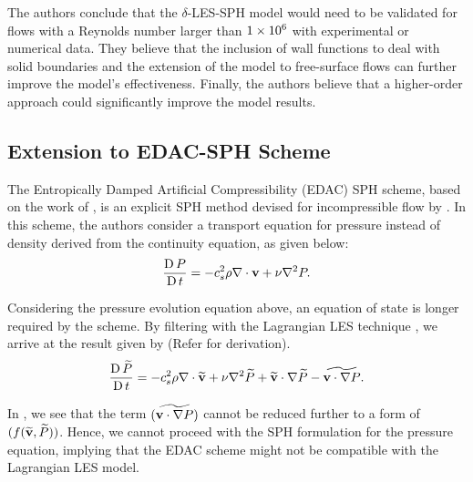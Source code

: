 The authors conclude that the $\delta$-LES-SPH model would need to be validated for flows with a Reynolds number larger than $1 \times {10}^{6}$ with experimental or numerical data. They believe that the inclusion of wall functions to deal with solid boundaries and the extension of the model to free-surface flows can further improve the model’s effectiveness. Finally, the authors believe that a higher-order approach could significantly improve the model results.

\subsection{Extension to EDAC-SPH Scheme}
\label{sec:Extension-to-EDAC-SPH-Scheme}
The Entropically Damped Artificial Compressibility (EDAC) SPH scheme, based on the work of \cite{Clausen2013}, is an explicit SPH method devised for incompressible flow by \cite{Ramachandran2019}.
In this scheme, the authors consider a transport equation for pressure instead of density derived from the continuity equation, as given below:
\begin{equation}
    \frac{\operatorname{D} P}{\operatorname{D} t} = -c_s^2 \rho \nabla \cdot \mathbf{v} + \nu \nabla^2 P.
    \label{eq:Ramachandran2019-edac-p-transport}
\end{equation}

Considering the pressure evolution equation above, an equation of state is longer required by the scheme.
By filtering  with the Lagrangian LES technique \parencite{DiMascio2017}, we arrive at the result given by  (Refer  for derivation).
\begin{equation}
    \frac{\operatorname{D} \widetilde{P}}{\operatorname{D} t} = -c_s^2 \rho \nabla \cdot \widetilde{\mathbf{v}} + \nu \nabla^2 \widetilde{P} + \widetilde{\mathbf{v}} \cdot \nabla \widetilde{P} - \widetilde{\mathbf{v}\cdot\nabla P}.
    \label{eq:edac-filtered}
\end{equation}

In , we see that the term $(\widetilde{\mathbf{v}\cdot\nabla P})$ cannot be reduced further to a form of $(f(\widetilde{\mathbf{v}}, \widetilde{P}))$. Hence, we cannot proceed with the SPH formulation for the pressure equation, implying that the EDAC scheme might not be compatible with the Lagrangian LES model.

